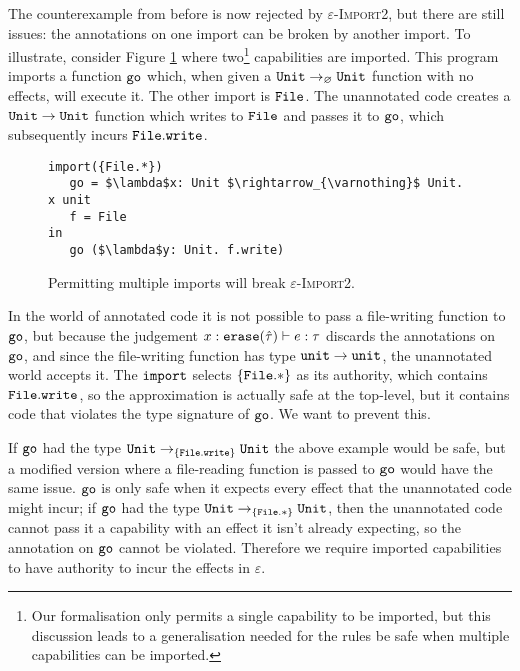 The counterexample from before is now rejected by \textsc{$\varepsilon$-Import2}, but there are still issues: the annotations on one import can be broken by another import. To illustrate, consider Figure \ref{fig:rule_import2_counterexample} where two\footnote{Our formalisation only permits a single capability to be imported, but this discussion leads to a generalisation needed for the rules be safe when multiple capabilities can be imported.} capabilities are imported. This program imports a function $\mathtt{go}$ which, when given a $\mathtt{Unit} \rightarrow_{\varnothing} \mathtt{Unit}$ function with no effects, will execute it. The other import is $\mathtt{File}$. The unannotated code creates a $\mathtt{Unit} \rightarrow \mathtt{Unit}$ function which writes to $\mathtt{File}$ and passes it to $\mathtt{go}$, which subsequently incurs $\mathtt{File.write}$.

\begin{figure}[h]

\begin{lstlisting}
import({File.*})
   go = $\lambda$x: Unit $\rightarrow_{\varnothing}$ Unit. x unit
   f = File
in
   go ($\lambda$y: Unit. f.write)

\end{lstlisting}

\vspace{-7pt}
\caption{Permitting multiple imports will break \textsc{$\varepsilon$-Import2}.}
\label{fig:rule_import2_counterexample}
\end{figure}

In the world of annotated code it is not possible to pass a file-writing function to $\mathtt{go}$, but because the judgement $x: \mathtt{erase}(\hat \tau) \vdash e: \tau$ discards the annotations on $\mathtt{go}$, and since the file-writing function has type $\mathtt{unit} \rightarrow \mathtt{unit}$, the unannotated world accepts it. The $\mathtt{import}$ selects $\{ \mathtt{File.*} \}$ as its authority, which contains $\mathtt{File.write}$, so the approximation is actually safe at the top-level, but it contains code that violates the type signature of $\mathtt{go}$. We want to prevent this.

If $\mathtt{go}$ had the type $\mathtt{Unit} \rightarrow_{\{ \mathtt{File.write} \}} \mathtt{Unit}$ the above example would be safe, but a modified version where a file-reading function is passed to $\mathtt{go}$ would have the same issue. $\mathtt{go}$ is only safe when it expects every effect that the unannotated code might incur; if $\mathtt{go}$ had the type $\mathtt{Unit} \rightarrow_{\{ \mathtt{File.*} \}} \mathtt{Unit}$, then the unannotated code cannot pass it a capability with an effect it isn't already expecting, so the annotation on $\mathtt{go}$ cannot be violated. Therefore we require imported capabilities to have authority to incur the effects in $\varepsilon$.

